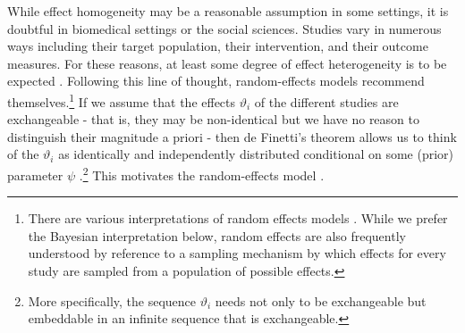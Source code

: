 While effect homogeneity may be a reasonable assumption in some settings, it is doubtful in biomedical settings or the social sciences. Studies vary in numerous ways including their target population, their intervention, and their outcome measures. For these reasons, at least some degree of effect heterogeneity is to be expected \citep{Higgins_Thompson_Spiegelhalter_2009}. 
Following this line of thought, random-effects models recommend themselves.\footnote{There are various interpretations of random effects models \citep{Higgins_Thompson_Spiegelhalter_2009,Cooper_2009,Gelman_2005}. While we prefer the Bayesian interpretation below, random effects are also frequently understood by reference to a sampling mechanism by which effects for every study are sampled from a population of possible effects.} 
If we assume that the effects $\vartheta_i$ of the different studies are exchangeable - that is, they may be non-identical but we have no reason to distinguish their magnitude a priori - then de Finetti's theorem allows us to think of the $\vartheta_i$ as identically and independently distributed conditional on some (prior) parameter $\psi$ \citep{Bernardo_1994}.\footnote{More specifically, the sequence ${\vartheta_i}$ needs not only to be exchangeable but embeddable in an infinite sequence that is exchangeable.} 
This motivates the random-effects model \citep{Whitehead_2002}.

